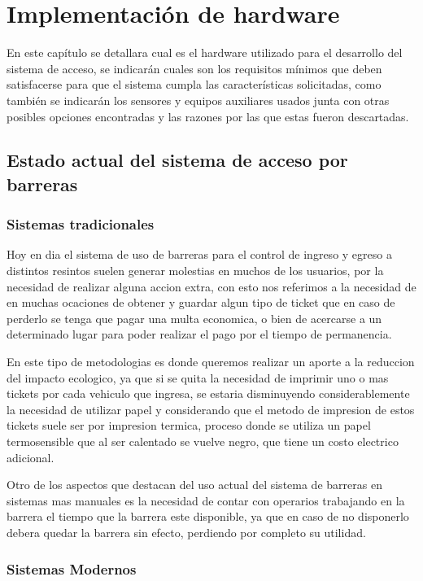 \chapter{Implementación de hardware}
En este capítulo se detallara cual es el hardware utilizado para el desarrollo del sistema de acceso, se indicarán cuales
son los requisitos mínimos que deben satisfacerse para que el sistema cumpla las características solicitadas, como
también se indicarán los sensores y equipos auxiliares usados junta con otras posibles opciones encontradas y las
razones por las que estas fueron descartadas.


\section{Estado actual del sistema de acceso por barreras}

\subsection{Sistemas tradicionales}

Hoy en dia el sistema de uso de barreras para el control de ingreso y egreso a distintos resintos suelen generar molestias
en muchos de los usuarios, por la necesidad de realizar alguna accion extra, con esto nos referimos a la necesidad de 
en muchas ocaciones de obtener y guardar algun tipo de ticket que en caso de perderlo se tenga que pagar una
multa economica, o bien de acercarse a un determinado lugar para poder realizar el pago por el tiempo de permanencia.

En este tipo de metodologias es donde queremos realizar un aporte a la reduccion del impacto ecologico, ya que si se quita
la necesidad de imprimir uno o mas tickets por cada vehiculo que ingresa, se estaria disminuyendo considerablemente la 
necesidad de utilizar papel y considerando que el metodo de impresion de estos tickets suele ser por impresion termica,
proceso donde se utiliza un papel termosensible que al ser calentado se vuelve negro, que tiene un costo electrico
adicional.

Otro de los aspectos que destacan del uso actual del sistema de barreras en sistemas mas manuales es la necesidad de 
contar con  operarios trabajando en la barrera el tiempo que la barrera este disponible, ya que en caso de no disponerlo 
debera quedar la barrera sin efecto, perdiendo por completo su utilidad.

\subsection{Sistemas Modernos}

